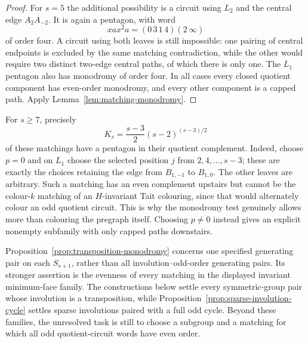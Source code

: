 \documentclass[11pt,a4paper]{article}
\theoremstyle{definition}
\theoremstyle{remark}
\begin{document}
\begin{proof}
For $s=5$ the additional possibility is a circuit using $L_2$ and the central edge $A_2A_{-2}$.  It is again a pentagon, with word
\[
 xax^2a=(0\,3\,1\,4)(2\,\infty)
\]
of order four.  A circuit using both leaves is still impossible: one pairing of central endpoints is excluded by the same matching contradiction, while the other would require two distinct two-edge central paths, of which there is only one.  The $L_1$ pentagon also has monodromy of order four.  In all cases every closed quotient component has even-order monodromy, and every other component is a capped path.  Apply Lemma~\ref{lem:matching-monodromy}.
\end{proof}

For $s\ge7$, precisely
\[
 K_s=\frac{s-3}{2}(s-2)^{(s-3)/2}
\]
of these matchings have a pentagon in their quotient complement.  Indeed, choose $p=0$ and on $L_1$ choose the selected position $j$ from $2,4,\ldots,s-3$; these are exactly the choices retaining the edge from $B_{1,-1}$ to $B_{1,0}$.  The other leaves are arbitrary.  Such a matching has an even complement upstairs but cannot be the colour-$k$ matching of an $H$-invariant Tait colouring, since that would alternately colour an odd quotient circuit.  This is why the monodromy test genuinely allows more than colouring the pregraph itself.  Choosing $p\ne0$ instead gives an explicit nonempty subfamily with only capped paths downstairs.

Proposition~\ref{prop:transposition-monodromy} concerns one specified generating pair on each $S_{s+1}$, rather than all involution--odd-order generating pairs.  Its stronger assertion is the evenness of every matching in the displayed invariant minimum-face family.  The constructions below settle every symmetric-group pair whose involution is a transposition, while Proposition~\ref{prop:sparse-involution-cycle} settles sparse involutions paired with a full odd cycle.  Beyond these families, the unresolved task is still to choose a subgroup and a matching for which all odd quotient-circuit words have even order.
\end{document}
